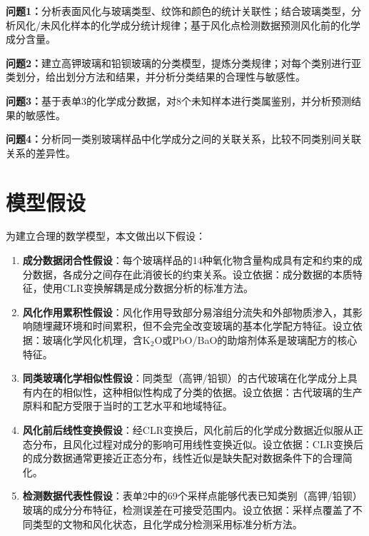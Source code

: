 \documentclass[12pt,a4paper]{ctexart}
\begin{document}
\textbf{问题1：}分析表面风化与玻璃类型、纹饰和颜色的统计关联性；结合玻璃类型，分析风化/未风化样本的化学成分统计规律；基于风化点检测数据预测风化前的化学成分含量。

\textbf{问题2：}建立高钾玻璃和铅钡玻璃的分类模型，提炼分类规律；对每个类别进行亚类划分，给出划分方法和结果，并分析分类结果的合理性与敏感性。

\textbf{问题3：}基于表单3的化学成分数据，对8个未知样本进行类属鉴别，并分析预测结果的敏感性。

\textbf{问题4：}分析同一类别玻璃样品中化学成分之间的关联关系，比较不同类别间关联关系的差异性。


\section{模型假设}

为建立合理的数学模型，本文做出以下假设：

\begin{enumerate}[label=(\arabic*), leftmargin=*]
    \item \textbf{成分数据闭合性假设}：每个玻璃样品的14种氧化物含量构成具有定和约束的成分数据，各成分之间存在此消彼长的约束关系。设立依据：成分数据的本质特征\cite{2}，使用CLR变换解耦是成分数据分析的标准方法。
    \item \textbf{风化作用累积性假设}：风化作用导致部分易溶组分流失和外部物质渗入，其影响随埋藏环境和时间累积，但不会完全改变玻璃的基本化学配方特征。设立依据：玻璃化学风化机理\cite{3}，含K$_2$O或PbO/BaO的助熔剂体系是玻璃配方的核心特征。
    \item \textbf{同类玻璃化学相似性假设}：同类型（高钾/铅钡）的古代玻璃在化学成分上具有内在的相似性，这种相似性构成了分类的依据。设立依据：古代玻璃的生产原料和配方受限于当时的工艺水平和地域特征\cite{1}。
    \item \textbf{风化前后线性变换假设}：经CLR变换后，风化前后的化学成分数据近似服从正态分布，且风化过程对成分的影响可用线性变换近似。设立依据：CLR变换后的成分数据通常更接近正态分布\cite{2}，线性近似是缺失配对数据条件下的合理简化。
    \item \textbf{检测数据代表性假设}：表单2中的69个采样点能够代表已知类别（高钾/铅钡）玻璃的成分分布特征，检测误差在可接受范围内。设立依据：采样点覆盖了不同类型的文物和风化状态，且化学成分检测采用标准分析方法。
\end{enumerate}


\end{document}
